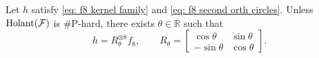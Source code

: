
\begin{lemma}
\label{lm: f8 self mating}
Let $h$ satisfy \eqref{eq: f8 kernel family} and
\eqref{eq: f8 second orth circles}.  
Unless $\operatorname{Holant}(\mathcal{F})$ is
\#P-hard, there exists $\theta\in\mathbb R$ such that
\begin{equation}
 h=R_\theta^{\otimes8}f_8,\qquad
 R_\theta=
 \begin{bmatrix}
 \cos\theta&\sin\theta\\
 -\sin\theta&\cos\theta
 \end{bmatrix}.
 \label{eq: f8 real orbit}
\end{equation}
\end{lemma}

